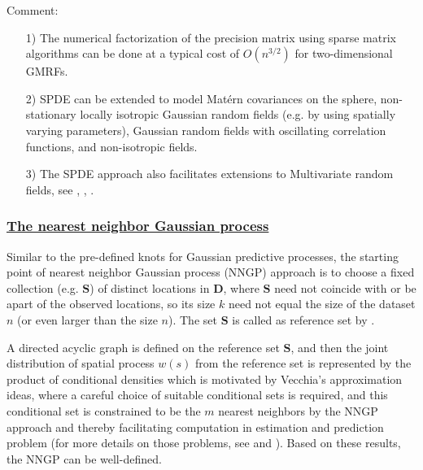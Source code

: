 \documentclass[
12pt, %
a4paper, %
oneside, %
headinclude,footinclude, %
BCOR5mm, %
]{scrartcl}
\begin{document}
\textcolor[rgb]{1.00,0.00,1.00}{Comment:}
\begin{itemize}
\item [1)]The numerical factorization of the precision matrix using sparse matrix algorithms can be done at a typical cost of $O(n^{3/2})$ for two-dimensional GMRFs.
\item [2)]SPDE can be extended to model Matérn covariances on the sphere, non-stationary locally isotropic Gaussian random fields (e.g. by
using spatially varying parameters), Gaussian random fields with oscillating correlation functions, and non-isotropic fields.
\item [3)]The SPDE approach also facilitates extensions to Multivariate random fields, see \href{https://chenyw68.github.io/Literature/[2013] Multivariate Gaussian random fields using systems of stochastic partial differential equations.pdf}{\cite{hu2013multivariate}}, \href{https://chenyw68.github.io/Literature/[2016]Spatial modeling with system of stochastic partial differential equations.pdf}{\cite{hu2016spatial}}, \href{https://chenyw68.github.io/Literature/[2020]Multivariate type G Matern stochastic partial differential equation random fields.pdf}{\cite{bolin2020multivariate}}.
\end{itemize}

\subsubsection{\href{https://chenyw68.github.io/Literature[2020]spNNGP R package for Nearest Neighbor Gaussian Process models.pdf}{The nearest neighbor Gaussian process}}
Similar to the pre-defined knots for Gaussian predictive processes, the starting point of nearest neighbor Gaussian process (NNGP) approach is to choose a fixed collection (e.g. $\boldsymbol{S}$) of distinct locations in $\boldsymbol{D}$, where $\boldsymbol{S}$ need not coincide with or be apart of the
observed locations, so its size $k$ need not equal the size of the dataset $n$ (or \textcolor[rgb]{0.50,0.50,0.50}{even larger than the size $n$}). The set $\boldsymbol{S}$ is called as reference set by
\href{https://chenyw68.github.io/Literature/[2016]Hierarchical nearest-neighbor Gaussian process models for large geostatistical datasets.pdf}{\cite{datta2016hierarchical}}. 

A directed acyclic graph is defined on the reference set $\boldsymbol{S}$, and then the joint distribution of spatial process $w(s)$ from the reference set is represented by the product of conditional densities which is motivated by Vecchia’s approximation \citep{vecchia1988estimation} ideas, where a careful choice of suitable conditional sets is required, and this conditional set is constrained to be the $m$ nearest neighbors by the NNGP approach and thereby facilitating computation in estimation and prediction problem (for more details on those problems, see \href{https://chenyw68.github.io/Literature/[2017]Applying Nearest Neighbor Gaussian Processes to Massive Spatial Data Sets.pdf}{\citep{finley2017applying}} and \href{https://chenyw68.github.io/Literature/[2019]Efficient algorithms for bayesian nearest neighbor gaussian processes.pdf}{\cite{finley2019efficient}}
). Based on these results, the NNGP can be well-defined.
\end{document}
